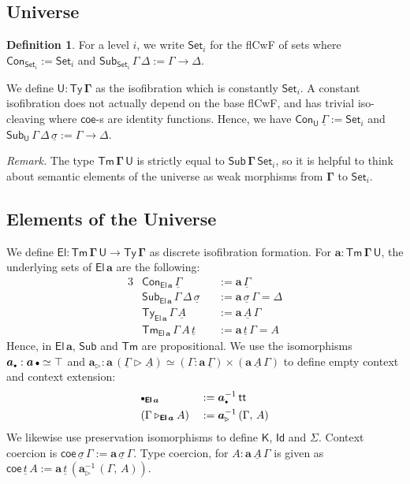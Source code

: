 \documentclass{article}
\theoremstyle{definition}
\newtheorem{definition}{Definition}
\theoremstyle{theorem}
\newcommand{\Con}{\mathsf{Con}}
\newcommand{\Sub}{\mathsf{Sub}}
\newcommand{\Tm}{\mathsf{Tm}}
\newcommand{\Ty}{\mathsf{Ty}}
\newcommand{\U}{\mathsf{U}}
\newcommand{\El}{\mathsf{El}}
\newcommand{\Id}{\mathsf{Id}}
\renewcommand{\tt}{\mathsf{tt}}
\newcommand{\ra}{\rightarrow}
\newcommand{\Set}{\mathsf{Set}}
\newcommand{\ext}{\triangleright}
\newcommand{\emptycon}{\scaleobj{.75}\bullet}
\newcommand{\K}{\mathsf{K}}
\newcommand{\bSub}{\boldsymbol{\Sub}}
\newcommand{\bTm}{\boldsymbol{\Tm}}
\newcommand{\bGamma}{\boldsymbol{\Gamma}}
\newcommand{\ba}{\boldsymbol{a}}
\newcommand{\bSet}{\boldsymbol{\Set}}
\newcommand{\bU}{\boldsymbol{\U}}
\newcommand{\bEl}{\boldsymbol{\El}}
\newcommand{\ul}[1]{\underline{#1}}
\newcommand{\ulGamma}{\ul{\Gamma}}
\newcommand{\ulsigma}{\ul{\sigma}}
\newcommand{\ult}{\ul{t}}
\newcommand{\ulA}{\ul{A}}
\newcommand{\coe}{\mathsf{coe}}
\begin{document}
\subsection{Universe}
\label{sec:universe}

\begin{definition}
For a level $i$, we write $\bSet_i$ for the flCwF of sets where $\Con_{\bSet_i}
:= \Set_i$ and $\Sub_{\bSet_i}\,\Gamma\,\Delta := \Gamma \ra \Delta$.
\end{definition}

We define $\boldsymbol{\U : \Ty\,\Gamma}$ as the isofibration which is
constantly $\bSet_i$. A constant isofibration does not actually depend on the
base flCwF, and has trivial iso-cleaving where $\coe$-s are identity
functions. Hence, we have $\Con_{\bU}\,\ulGamma := \Set_i$ and
$\Sub_{\bU}\,\Gamma\,\Delta\,\ulsigma := \Gamma \ra \Delta$.

\emph{Remark.} The type $\bTm\,\bGamma\,\bU$ is strictly equal to
$\bSub\,\bGamma\,\bSet_i$, so it is helpful to think about semantic elements of
the universe as weak morphisms from $\bGamma$ to $\bSet_i$.

\subsection{Elements of the Universe}

We define $\boldsymbol{\El : \Tm\,\Gamma\,\U \ra \Ty\,\Gamma}$ as discrete
isofibration formation. For $\boldsymbol{a : \Tm\,\Gamma\,\U}$, the underlying
sets of $\bEl\,\ba$ are the following:
\begin{alignat*}{3}
  & \Con_{\bEl\,\ba}\,\ulGamma && := \ba\,\ulGamma\\
  & \Sub_{\bEl\,\ba}\,\Gamma\,\Delta\,\ulsigma && := \ba\,\ulsigma\,\Gamma = \Delta\\
  & \Ty_{\bEl\,\ba}\,\Gamma\,\ulA && := \ba\,\ulA\,\Gamma\\
  & \Tm_{\bEl\,\ba}\,\Gamma\,A\,\ult && := \ba\,\ult\,\Gamma = A
\end{alignat*}
Hence, in $\bEl\,\ba$, $\Sub$ and $\Tm$ are propositional. We use the
isomorphisms $\ba_{\emptycon} : \ba\,\emptycon \simeq \top$ and $\ba_{\ext} :
\ba\,(\ulGamma\ext\ulA) \simeq (\Gamma :
\ba\,\ulGamma)\times(\ba\,\ulA\,\Gamma)$ to define empty context and context
extension:
\begin{alignat*}{3}
  & \emptycon_{\bEl\,\ba} && := \ba_{\emptycon}^{-1}\,\tt\\
  & (\Gamma\ext_{\bEl\,\ba} A) && := \ba_{\ext}^{-1}\,(\Gamma,\,A)
\end{alignat*}
We likewise use preservation isomorphisms to define $\K$, $\Id$ and $\Sigma$.
Context coercion is $\coe\,\ulsigma\,\Gamma := \ba\,\ulsigma\,\Gamma$. Type
coercion, for $A : \ba\,\ulA\,\Gamma$ is given as $\coe\,\ult\,A :=
\ba\,\ult\,(\ba_{\ext}^{-1}\,(\Gamma,\,A))$.
\end{document}
